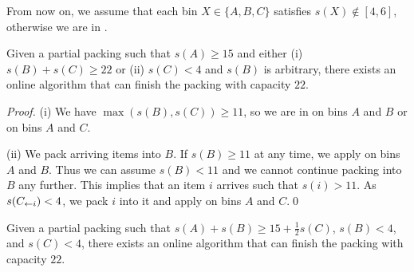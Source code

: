 From now on, we assume that each bin $X\in\{A,B,C\}$ satisfies $s(X) \not\in [4,6]$, otherwise we are in .

\begin{goodsit}\label{lem:gs3}
Given a partial packing such that $s(A) \ge 15$ and either
{\rm(i)} $s(B)+s(C)\ge 22$ or
{\rm(ii)} $s(C)<4$ and $s(B)$ is arbitrary,
there exists an online algorithm that can finish the packing with capacity $22$.
\end{goodsit}

\begin{proof}
(i) We have
$\max(s(B),s(C))\ge11$, so 
we are in  on bins
$A$ and $B$ or on bins $A$ and $C$. %

(ii) We pack arriving items into $B$. If $s(B) \geq
11$ at any time, we apply  on bins $A$ and $B$. Thus we can
assume $s(B) < 11$ and we cannot continue packing into $B$ any
further. This implies that an item $i$ arrives such that $s(i) >
11$. As $s(C_{\leftarrow i})<4$, we pack $i$ into it and apply  on
bins $A$ and $C$.\qed
\end{proof}

\begin{goodsit}\label{lem:gs4}
Given a partial packing such that 
$s(A) +s(B) \geq 15+\frac{1}{2}s(C)$, $s(B) < 4$, and $s(C) < 4$,
there exists an online algorithm that can finish the packing with capacity $22$.
\end{goodsit}

